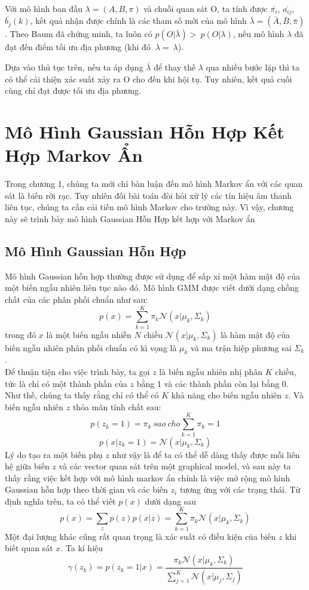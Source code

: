 \documentclass[13pt]{extreport}
\begin{document}
Với mô hình ban đầu $  \lambda = \left( A,B, \pi  \right)  $ và chuỗi quan sát O, ta tính được ${\bar{\pi_i}}$, ${\bar{a_{ij}}}$, ${\bar{b_j}}(k)$, kết quả nhận được chính là các tham số mới của mô hình $  \bar{\lambda} = \left( \bar{A},\bar{B}, \bar{\pi}  \right)  $. Theo Baum đã chứng minh, ta luôn có $ p \left( O \vert  \bar{\lambda}  \right) >~p \left( O \vert  \lambda  \right)  $, nếu mô hình $  \lambda  $ đã đạt đến điểm tối ưu địa phương (khi đó $ ~ \lambda =~ \lambda  $). \par
Dựa vào thủ tục trên, nếu ta áp dụng $\bar{\lambda}$ để thay thế $\lambda$ qua nhiều bước lặp thì ta có thể cải thiện xác suất xảy ra O cho đến khi hội tụ. Tuy nhiên, kết quả cuối cùng chỉ đạt được tối ưu địa phương.
\chapter{Mô Hình Gaussian Hỗn Hợp Kết Hợp Markov Ẩn}
Trong chương 1, chúng ta mới chỉ bàn luận đến mô hình Markov ẩn với các quan sát là biến rời rạc. Tuy nhiên đối bài toán đòi hỏi xử lý các tín hiệu âm thanh liên tục, chúng ta cần cải tiến mô hình Markov cho trường này. Vì vậy, chương này sẽ trình bày mô hình Gaussian Hỗn Hợp kết hợp với Markov ẩn

\section{Mô Hình Gaussian Hỗn Hợp}
Mô hình Gaussian hỗn hợp thường được sử dụng để sấp xỉ một hàm mật độ của một biến ngẫu nhiên liên tục nào đó. Mô hình GMM được viết dưới dạng chồng chất của các phân phối chuẩn như sau:
$$p(x) = \sum_{k=1}^{K} \pi_k \mathcal{N}(x | \mu_k, \Sigma_k)$$
trong đó $x$ là một biến ngẫu nhiễn $N$ chiều $\mathcal{N}(x | \mu_k, \Sigma_k)$ là hàm mật độ của biến ngẫu nhiên phân phối chuẩn có kì vọng là $\mu_k$ và ma trận hiệp phương sai $\Sigma_k$. \\

Để thuận tiện cho việc trình bày, ta gọi $z$ là biến ngẫu nhiên nhị phân $K$ chiều, tức là chỉ có một thành phần của $z$ bằng 1 và các thành phần còn lại bằng 0. Như thế, chúng ta thấy rằng chỉ có thể có $K$ khả năng cho biến ngẫu nhiên $z$. Và biến ngẫu nhiên $z$ thỏa mãn tính chất sau:
$$ p(z_k = 1) = \pi_k \ sao \ cho \sum_{k=1}^{K} \pi_k =  1$$
$$p(x|z_k = 1) = \mathcal{N}(x| \mu_k, \Sigma_k)$$
Lý do tạo ra một biến phụ $z$ như vậy là để ta có thể dễ dàng thấy được mỗi liên hệ giữa biến $z$ và các vector quan sát trên một graphical model, và sau này ta thấy rằng việc kết hợp với mô hình markov ẩn chính là việc mở rộng mô hình Gaussian hỗn hợp theo thời gian và các biến $z_i$ tương ứng với các trạng thái. Từ định nghĩa trên, ta có thể viết $p(x)$ dưới dạng sau
$$p(x) = \sum_{z} p(z) p(x | z) = \sum_{k=1}^{K} \pi_k \mathcal{N}(x | \mu_k, \Sigma_k) $$
Một đại lượng khác cũng rất quan trọng là xác suất có điều kiện của biến $z$ khi biết quan sát $x$. Ta kí hiệu
$$\gamma(z_k) = p(z_k = 1| x) = \frac{\pi_k \mathcal{N}(x|\mu_k, \Sigma_k)}{\sum_{j=1}^{K} \mathcal{N}(x|\mu_j, \Sigma_j)}$$
\end{document}
